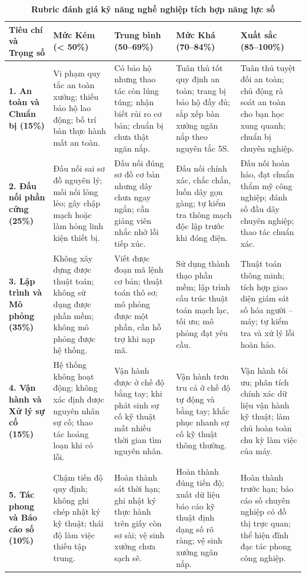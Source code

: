 \begin{table}[htbp]
\centering
\footnotesize
\setlength{\tabcolsep}{3.5pt}
\caption{\textbf{Rubric đánh giá kỹ năng nghề nghiệp tích hợp năng lực số}}
\vspace{0.2cm}
\begin{tabularx}{\textwidth}{L{2.8cm} X X X X}
\toprule
\textbf{Tiêu chí và Trọng số} & \textbf{Mức Kém (< 50\%)} & \textbf{Trung bình (50--69\%)} & \textbf{Mức Khá (70--84\%)} & \textbf{Xuất sắc (85--100\%)} \\
\midrule
\textbf{1. An toàn và Chuẩn bị (15\%)} & Vi phạm quy tắc an toàn xưởng; thiếu bảo hộ lao động; bố trí bàn thực hành mất an toàn. & Có bảo hộ nhưng thao tác còn lúng túng; nhận biết rủi ro cơ bản; chuẩn bị chưa thật ngăn nắp. & Tuân thủ tốt quy định an toàn; trang bị bảo hộ đầy đủ; sắp xếp bàn xưởng ngăn nắp theo nguyên tắc 5S. & Tuân thủ tuyệt đối an toàn; chủ động rà soát an toàn cho bạn học xung quanh; chuẩn bị chuyên nghiệp. \\
\addlinespace
\textbf{2. Đấu nối phần cứng (25\%)} & Đấu nối sai sơ đồ nguyên lý; mối nối lỏng lẻo; gây chập mạch hoặc làm hỏng linh kiện thiết bị. & Đấu nối đúng sơ đồ cơ bản nhưng dây chưa ngay ngắn; cần giảng viên nhắc nhở lỗi tiếp xúc. & Đấu nối chính xác, chắc chắn, luồn dây gọn gàng; tự kiểm tra thông mạch độc lập trước khi đóng điện. & Đấu nối hoàn hảo, đạt chuẩn thẩm mỹ công nghiệp; đánh số đầu dây chuyên nghiệp; thao tác chuẩn xác. \\
\addlinespace
\textbf{3. Lập trình và Mô phỏng (35\%)} & Không xây dựng được thuật toán; không sử dụng được phần mềm; không mô phỏng được hệ thống. & Viết được đoạn mã lệnh cơ bản; thuật toán thô sơ; mô phỏng được một phần, cần hỗ trợ khi nạp mã. & Sử dụng thành thạo phần mềm; lập trình cấu trúc thuật toán mạch lạc, tối ưu; mô phỏng đạt yêu cầu. & Thuật toán thông minh; tích hợp giao diện giám sát số hóa người -- máy; tự kiểm tra và xử lý lỗi hoàn hảo. \\
\addlinespace
\textbf{4. Vận hành và Xử lý sự cố (15\%)} & Hệ thống không hoạt động; không xác định được nguyên nhân sự cố; thao tác hoảng loạn khi có lỗi. & Vận hành được ở chế độ bằng tay; khi phát sinh sự cố kỹ thuật mất nhiều thời gian tìm nguyên nhân. & Vận hành trơn tru cả ở chế độ tự động và bằng tay; khắc phục nhanh sự cố kỹ thuật thông thường. & Vận hành tối ưu; phân tích chính xác dữ liệu vận hành kỹ thuật; làm chủ hoàn toàn chu kỳ làm việc của máy. \\
\addlinespace
\textbf{5. Tác phong và Báo cáo số (10\%)} & Chậm tiến độ quy định; không ghi chép nhật ký kỹ thuật; thái độ làm việc thiếu tập trung. & Hoàn thành sát thời hạn; ghi nhật ký thực hành trên giấy còn sơ sài; vệ sinh xưởng chưa sạch sẽ. & Hoàn thành đúng tiến độ; xuất dữ liệu báo cáo kỹ thuật định dạng số rõ ràng; vệ sinh xưởng ngăn nắp. & Hoàn thành trước hạn; báo cáo số chuyên nghiệp có đồ thị trực quan; thể hiện đĩnh đạc tác phong công nghiệp. \\
\bottomrule
\end{tabularx}
\end{table}

